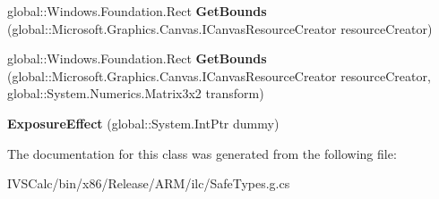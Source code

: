 \begin{DoxyCompactItemize}
\mbox{\label{class_microsoft_1_1_graphics_1_1_canvas_1_1_effects_1_1_exposure_effect_a1270050e057b25ed336629d9dbbe3c97}} 
global\+::\+Windows.\+Foundation.\+Rect {\bfseries Get\+Bounds} (global\+::\+Microsoft.\+Graphics.\+Canvas.\+I\+Canvas\+Resource\+Creator resource\+Creator)
\item 
\mbox{\label{class_microsoft_1_1_graphics_1_1_canvas_1_1_effects_1_1_exposure_effect_a0c2998bcc281563540602e5cd9876e4c}} 
global\+::\+Windows.\+Foundation.\+Rect {\bfseries Get\+Bounds} (global\+::\+Microsoft.\+Graphics.\+Canvas.\+I\+Canvas\+Resource\+Creator resource\+Creator, global\+::\+System.\+Numerics.\+Matrix3x2 transform)
\item 
\mbox{\label{class_microsoft_1_1_graphics_1_1_canvas_1_1_effects_1_1_exposure_effect_a71b4e6e4d796061fbe70e8dbafa96676}} 
{\bfseries Exposure\+Effect} (global\+::\+System.\+Int\+Ptr dummy)
\end{DoxyCompactItemize}


The documentation for this class was generated from the following file\+:\begin{DoxyCompactItemize}
\item 
I\+V\+S\+Calc/bin/x86/\+Release/\+A\+R\+M/ilc/Safe\+Types.\+g.\+cs\end{DoxyCompactItemize}
